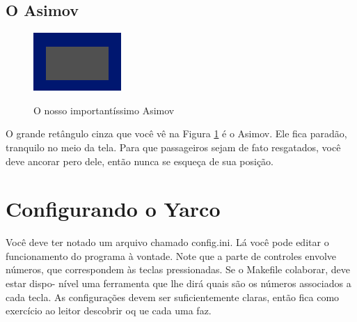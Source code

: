 \documentclass[10pt,brazil]{article}
\begin{document}
\subsection{O Asimov}

\begin{figure}
\begin{center}
\includegraphics{ship}
\label{img:ship}
\caption{O nosso importantíssimo Asimov}
\end{center}
\end{figure}

O grande retângulo cinza que você vê na Figura \ref{img:ship} é o Asimov. Ele fica paradão, tranquilo no meio da tela.
Para que passageiros sejam de fato resgatados, você deve ancorar pero dele, então nunca se esqueça de sua posição.

\section{Configurando o Yarco}

Você deve ter notado um arquivo chamado config.ini. Lá você pode editar o funcionamento do programa à vontade. Note que
a parte de controles envolve números, que correspondem às teclas pressionadas. Se o Makefile colaborar, deve estar dispo-
nível uma ferramenta que lhe dirá quais são os números associados a cada tecla. As configurações devem ser suficientemente
claras, então fica como exercício ao leitor descobrir oq ue cada uma faz.
\end{document}
